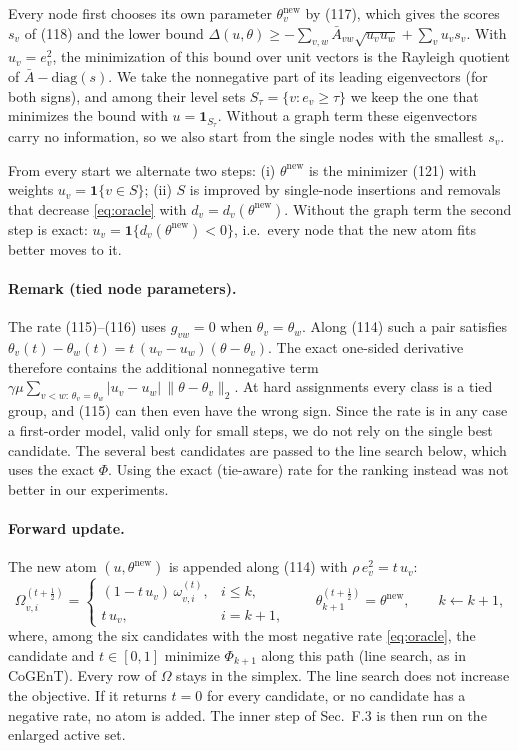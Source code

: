 Every node first chooses its own parameter $\theta^{\mathrm{new}}_v$ by (117), which gives the
scores $s_v$ of (118) and the lower bound
$\Delta(u,\theta)\ge -\sum_{v,w}\bar A_{vw}\sqrt{u_vu_w}+\sum_v u_v s_v$. With $u_v=e_v^2$, the
minimization of this bound over unit vectors is the Rayleigh quotient of $\bar A-\mathrm{diag}(s)$.
We take the nonnegative part of its leading eigenvectors (for both signs), and among their level
sets $S_\tau=\{v: e_v\ge\tau\}$ we keep the one that minimizes the bound with $u=\mathbf 1_{S_\tau}$.
Without a graph term these eigenvectors carry no information, so we also start from the single
nodes with the smallest $s_v$.

From every start we alternate two steps:
(i) $\theta^{\mathrm{new}}$ is the minimizer (121) with weights $u_v=\mathbf 1\{v\in S\}$;
(ii) $S$ is improved by single-node insertions and removals that decrease \eqref{eq:oracle} with
$d_v=d_v(\theta^{\mathrm{new}})$.
Without the graph term the second step is exact: $u_v=\mathbf 1\{d_v(\theta^{\mathrm{new}})<0\}$,
i.e.\ every node that the new atom fits better moves to it.

\paragraph{Remark (tied node parameters).}
The rate (115)--(116) uses $g_{vw}=0$ when $\theta_v=\theta_w$. Along (114) such a pair satisfies
$\theta_v(t)-\theta_w(t)=t\,(u_v-u_w)(\theta-\theta_v)$. The exact one-sided derivative therefore
contains the additional nonnegative term
$\gamma\mu\sum_{v<w:\,\theta_v=\theta_w}|u_v-u_w|\,\|\theta-\theta_v\|_2$. At hard assignments
every class is a tied group, and (115) can then even have the wrong sign. Since the rate is in any
case a first-order model, valid only for small steps, we do not rely on the single best candidate.
The several best candidates are passed to the line search below, which uses the exact $\Phi$. Using
the exact (tie-aware) rate for the ranking instead was not better in our experiments.

\paragraph{Forward update.}
The new atom $(u,\theta^{\mathrm{new}})$ is appended along (114) with $\rho\, e_v^2 = t\,u_v$:
\begin{equation}
  \Omega^{(t+\frac12)}_{v,i}=
  \begin{cases}(1-t\,u_v)\,\omega^{(t)}_{v,i}, & i\le k,\\ t\,u_v, & i=k+1,\end{cases}
  \qquad \theta^{(t+\frac12)}_{k+1}=\theta^{\mathrm{new}},\qquad k\leftarrow k+1,
\end{equation}
where, among the six candidates with the most negative rate \eqref{eq:oracle}, the candidate and
$t\in[0,1]$ minimize $\Phi_{k+1}$ along this path (line search, as in CoGEnT). Every row of $\Omega$
stays in the simplex. The line search does not increase the objective. If it returns $t=0$ for
every candidate, or no candidate has a negative rate, no atom is added. The inner step of
Sec.~F.3 is then run on the enlarged active set.

